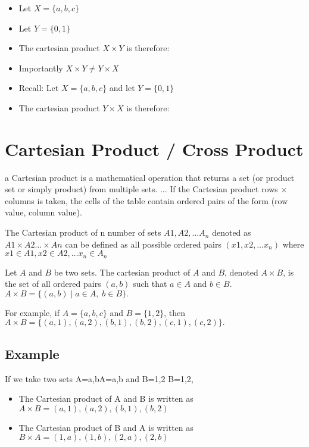 \documentclass[12pt]{article}
\begin{document}
\begin{itemize}
\item Let $X = \{a,b,c\}$
\item Let $Y = \{0,1\}$ 
\item The cartesian product $X \times Y$ is therefore:
\end{itemize}

\begin{itemize}
\item Importantly $X \times Y \neq Y \times X$
\item Recall: Let $X = \{a,b,c\}$ and let $Y = \{0,1\}$ 
\item The cartesian product $Y \times X$ is therefore:
\end{itemize}


\section{Cartesian Product / Cross Product}
a Cartesian product is a mathematical operation that returns a set (or product set or simply product) from multiple sets. ... If the Cartesian product rows × columns is taken, the cells of the table contain ordered pairs of the form (row value, column value).

The Cartesian product of n number of sets $A1,A2,\ldots A_n$ denoted as $A1\times A2 \ldots \times An$ can be defined as all possible ordered pairs $(x1,x2,\ldots x_n)$
where $x1\in A1,x2\in A2,\ldots x_n \in A_n$

 Let $ A$ and $ B$ be two sets. The cartesian product of $ A$ and $ B$, denoted  $ A \times B$, is the set of all ordered pairs $ (a,b)$ such that $ a \in A$ and $ b \in B$.
$\displaystyle A \times B = \{ (a,b) \; \vert \; a \in A, \; b \in B \}.$	   

For example, if  $ A=\{ a,b,c \}$ and  $ B= \{ 1,2 \}$, then
$\displaystyle A \times B = \{ (a,1), (a,2), (b,1), (b,2), (c,1), (c,2) \}.$

\subsection{Example}
If we take two sets A={a,b}A={a,b} and B={1,2}
B={1,2},

\begin{itemize}

\item The Cartesian product of A and B is written 
as  $A \times B={(a,1),(a,2),(b,1),(b,2)}$
\item The Cartesian product of B and A is written as  
$B\times A={(1,a),(1,b),(2,a),(2,b)}$
\end{itemize}
\end{document}
